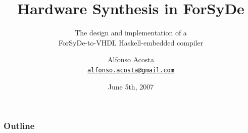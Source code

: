 \documentclass{beamer}
\title%
{Hardware Synthesis in ForSyDe}
\subtitle{The design and implementation of a\\ ForSyDe-to-VHDL Haskell-embedded compiler}
\author[A.Acosta] %
{Alfonso Acosta\\
\footnotesize \href{mailto:alfonso.acosta@gmail.com}{\nolinkurl{alfonso.acosta@gmail.com}}}
\institute[KTH] %
{Master's Thesis Defence\\ICT/ECS\\Royal Institute of Technology, Stockholm}
\date%
{June 5th, 2007}
\begin{document}
\begin{frame}
  \titlepage
\end{frame}

\begin{frame}
  \frametitle{Outline}
  \tableofcontents[pausesections]
\end{frame}





\beamerdefaultoverlayspecification{}
\end{document}

